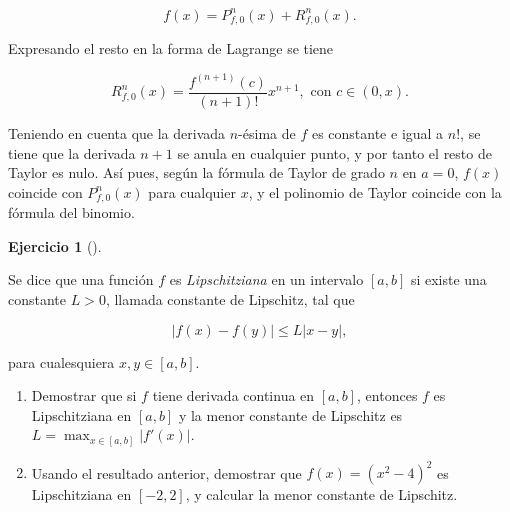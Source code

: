 \documentclass[
  a4paper,
]{scrreport}
\theoremstyle{definition}
\newtheorem{exercise}{Ejercicio}[chapter]
\theoremstyle{remark}
\begin{document}
\begin{tcolorbox}
\[
f(x) = P^n_{f,0}(x) + R^n_{f,0}(x).
\]

Expresando el resto en la forma de Lagrange se tiene

\[
R^n_{f,0}(x) = \frac{f^{(n+1)}(c)}{(n+1)!}x^{n+1}, \mbox{ con $c\in(0,x)$}. 
\]

Teniendo en cuenta que la derivada \(n\)-ésima de \(f\) es constante e
igual a \(n!\), se tiene que la derivada \(n+1\) se anula en cualquier
punto, y por tanto el resto de Taylor es nulo. Así pues, según la
fórmula de Taylor de grado \(n\) en \(a=0\), \(f(x)\) coincide con
\(P^n_{f,0}(x)\) para cualquier \(x\), y el polinomio de Taylor coincide
con la fórmula del binomio.

\end{tcolorbox}

\begin{exercise}[]\protect\hypertarget{exr-8}{}\label{exr-8}

Se dice que una función \(f\) es \emph{Lipschitziana} en un intervalo
\([a,b]\) si existe una constante \(L>0\), llamada constante de
Lipschitz, tal que

\[
|f(x)-f(y)|\leq L|x-y|,
\]

para cualesquiera \(x,y\in [a,b]\).

\begin{enumerate}
\def\labelenumi{\alph{enumi}.}
\item
  Demostrar que si \(f\) tiene derivada continua en \([a,b]\), entonces
  \(f\) es Lipschitziana en \([a,b]\) y la menor constante de Lipschitz
  es \(L=\max_{x\in [a,b]}|f'(x)|\).
\item
  Usando el resultado anterior, demostrar que \(f(x) = (x^2-4)^2\) es
  Lipschitziana en \([-2,2]\), y calcular la menor constante de
  Lipschitz.
\end{enumerate}

\end{exercise}
\end{document}
